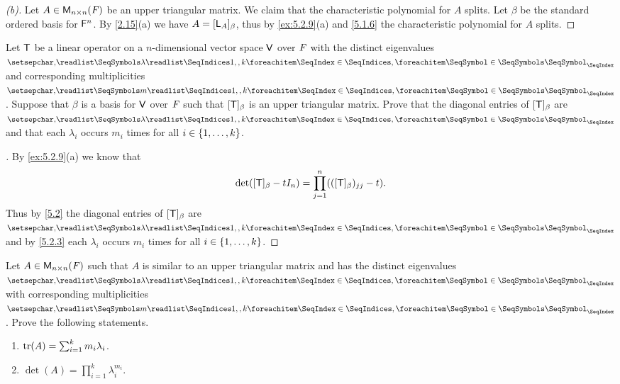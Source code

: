 \begin{proof}[(b)]
	Let \(A \in \ms[n][n][\F]\) be an upper triangular matrix.
	We claim that the characteristic polynomial for \(A\) splits.
	Let \(\beta\) be the standard ordered basis for \(\mathsf{F}^n\).
	By \cref{2.15}(a) we have \(A = [\mathsf{L}_A]_{\beta}\), thus by \cref{ex:5.2.9}(a) and \cref{5.1.6} the characteristic polynomial for \(A\) splits.
\end{proof}

\begin{ex}\label{ex:5.2.10}
	Let \(\mathsf{T}\) be a linear operator on a \(n\)-dimensional vector space \(\mathsf{V}\) over \(\mathit{F}\) with the distinct eigenvalues \(\seq{\lambda}{1,,k}\) and corresponding multiplicities \(\seq{m}{1,,k}\).
	Suppose that \(\beta\) is a basis for \(\mathsf{V}\) over \(\mathit{F}\) such that \([\mathsf{T}]_{\beta}\) is an upper triangular matrix.
	Prove that the diagonal entries of \([\mathsf{T}]_{\beta}\) are \(\seq{\lambda}{1,,k}\) and that each \(\lambda_i\) occurs \(m_i\) times for all \(i \in \left\lbrace1, \dots, k\right\rbrace\).
\end{ex}

\begin{proof}[]
	By \cref{ex:5.2.9}(a) we know that
	\[
		\det([\mathsf{T}]_{\beta} - t I_n) = \prod_{j = 1}^n (([\mathsf{T}]_{\beta})_{j j} - t).
	\]
	Thus by \cref{5.2} the diagonal entries of \([\mathsf{T}]_{\beta}\) are \(\seq{\lambda}{1,,k}\) and by \cref{5.2.3} each \(\lambda_i\) occurs \(m_i\) times for all \(i \in \left\lbrace1, \dots, k\right\rbrace\).
\end{proof}

\begin{ex}\label{ex:5.2.11}
	Let \(A \in \ms[n][n][\F]\) such that \(A\) is similar to an upper triangular matrix and has the distinct eigenvalues \(\seq{\lambda}{1,,k}\) with corresponding multiplicities \(\seq{m}{1,,k}\).
	Prove the following statements.
	\begin{enumerate}
		\item \(\tr(A) = \sum_{i = 1}^k m_i \lambda_i\).
		\item \(\det(A) = \prod_{i = 1}^k \lambda_i^{m_i}\).
	\end{enumerate}
\end{ex}

